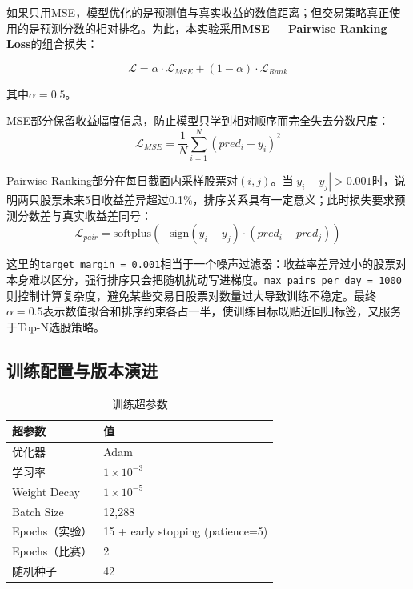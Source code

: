 \documentclass[10pt,a4paper]{ctexart}
\begin{document}
如果只用MSE，模型优化的是预测值与真实收益的数值距离；但交易策略真正使用的是预测分数的相对排名。为此，本实验采用\textbf{MSE + Pairwise Ranking Loss}的组合损失：

\begin{equation}
    \mathcal{L} = \alpha \cdot \mathcal{L}_{MSE} + (1-\alpha) \cdot \mathcal{L}_{Rank}
\end{equation}

其中$\alpha = 0.5$。

MSE部分保留收益幅度信息，防止模型只学到相对顺序而完全失去分数尺度：
\begin{equation}
    \mathcal{L}_{MSE} = \frac{1}{N}\sum_{i=1}^{N}(pred_i - y_i)^2
\end{equation}

Pairwise Ranking部分在每日截面内采样股票对$(i, j)$。当$|y_i-y_j|>0.001$时，说明两只股票未来5日收益差异超过0.1\%，排序关系具有一定意义；此时损失要求预测分数差与真实收益差同号：
\begin{equation}
    \mathcal{L}_{pair} = \mathrm{softplus}(-\mathrm{sign}(y_i - y_j) \cdot (pred_i - pred_j))
\end{equation}

这里的\texttt{target\_margin = 0.001}相当于一个噪声过滤器：收益率差异过小的股票对本身难以区分，强行排序只会把随机扰动写进梯度。\texttt{max\_pairs\_per\_day = 1000}则控制计算复杂度，避免某些交易日股票对数量过大导致训练不稳定。最终$\alpha=0.5$表示数值拟合和排序约束各占一半，使训练目标既贴近回归标签，又服务于Top-N选股策略。

\subsection{训练配置与版本演进}

\begin{table}[htbp]
    \centering
    \caption{训练超参数}
    \begin{tabular}{ll}
        \toprule
        超参数 & 值 \\
        \midrule
        优化器 & Adam \\
        学习率 & $1\times10^{-3}$ \\
        Weight Decay & $1\times10^{-5}$ \\
        Batch Size & 12,288 \\
        Epochs（实验） & 15 + early stopping (patience=5) \\
        Epochs（比赛） & 2 \\
        随机种子 & 42 \\
        \bottomrule
    \end{tabular}
\end{table}
\end{document}
